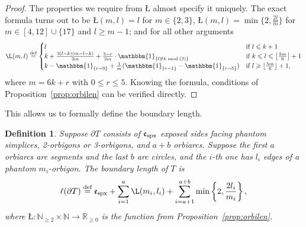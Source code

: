 \documentclass{amsart}
\newtheorem{definition}[conjecture]{Definition}
\newcommand{\defeq}{\stackrel{\tn{def}}{=}}
\newcommand{\tn}{\textnormal}
\begin{document}
\begin{proof}
The properties we require from $Ł$ almost specify it uniquely. The exact formula turns out to be $Ł(m,l)=l$ for $m\in\{2,3\}$, $Ł(m,l)=\min\{2,\tfrac{2l}{m}\}$ for $m\in[4,12]\cup\{17\}$ and $l\geqslant m-1$; and for all other arguments
\begin{equation*}
Ł(m,l)\defeq\begin{cases}l&\text{if }l\leqslant k+1\\k+\tfrac{3(l-k)(m-l-k)}{2m}+\tfrac{3-r}{2m}\cdot\mathbbm{1}_{\{l\not\equiv k\bmod(2)\}}&\text{if }k\leqslant l\leqslant\left\lfloor\tfrac{5m}{6}\right\rfloor+1\\k-\mathbbm{1}_{\{r=0\}}+\tfrac{1}{m}(\mathbbm{1}_{\{r=1\}}-\mathbbm{1}_{\{r=5\}})&\text{if }l\geqslant\lfloor\tfrac{5m}{6}\rfloor+1,\end{cases}
\end{equation*}
where $m=6k+r$ with $0\leqslant r\leqslant5$. Knowing the formula, conditions of Proposition~\ref{prop:orbilen} can be verified directly.
\end{proof}
This allows us to formally define the boundary length.
\begin{definition}\label{def:bdry_len}
Suppose $\partial T$ consists of $\mathfrak{e}_\tn{spx}$ exposed sides facing phantom simplices, 2-orbigons or 3-orbigons, and $a+b$ orbiarcs. Suppose the first $a$ orbiarcs are segments and the last $b$ are circles, and the $i$-th one has $l_i$ edges of a phantom $m_i$-orbigon. The \emph{boundary length} of $T$ is
\begin{equation*}
\ell(\partial T)\defeq \mathfrak{e}_\tn{spx}+\sum_{i=1}^aŁ(m_i,l_i)+\sum_{i=a+1}^{a+b}\min\left\{2,\frac{2l_i}{m_i}\right\},
\end{equation*}
where $Ł\colon\mathbb{N}_{\geqslant2}\times\mathbb{N}\to\mathbb{R}_{\geqslant0}$ is the function from Proposition~\ref{prop:orbilen}.
\end{definition}
\end{document}
